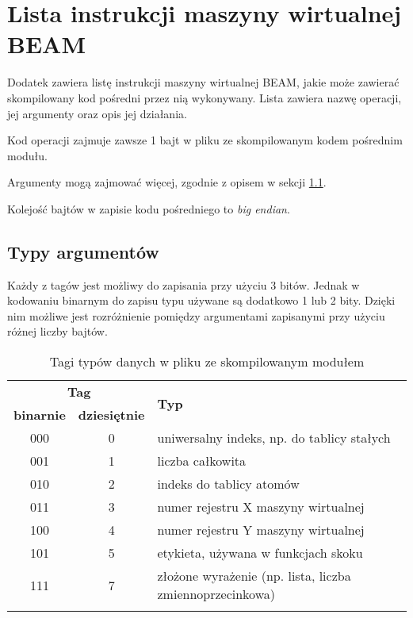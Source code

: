 \chapter{Lista instrukcji maszyny wirtualnej BEAM}
\label{cha:operacjeBeam}

Dodatek zawiera listę instrukcji maszyny wirtualnej BEAM, jakie może zawierać skompilowany kod pośredni przez nią wykonywany.
Lista zawiera nazwę operacji, jej argumenty oraz opis jej działania.

Kod operacji zajmuje zawsze 1 bajt w pliku ze skompilowanym kodem pośrednim modułu.

Argumenty mogą zajmować więcej, zgodnie z opisem w sekcji \ref{sec:opsTypes}.

Kolejość bajtów w zapisie kodu pośredniego to \emph{big endian}.


\section{Typy argumentów}
\label{sec:opsTypes}

Każdy z tagów jest możliwy do zapisania przy użyciu 3 bitów.
Jednak w kodowaniu binarnym do zapisu typu używane są dodatkowo 1 lub 2 bity. Dzięki nim możliwe jest rozróżnienie pomiędzy argumentami zapisanymi przy użyciu różnej liczby bajtów.

\begin{longtable}{|c|c|p{9cm}|}
\hline

\multicolumn{2}{|c|}{\textbf{Tag}} & \multirow{2}{*}{\textbf{Typ}} \\
\cline{1-2}
\textbf{binarnie} & \textbf{dziesiętnie} & \\
\hline
\endfirsthead

000 & 0 & uniwersalny indeks, np. do tablicy stałych \\
\hline
001 & 1 & liczba całkowita \\ 
\hline
010 & 2 & indeks do tablicy atomów \\
\hline
011 & 3 & numer rejestru X maszyny wirtualnej \\
\hline
100 & 4 & numer rejestru Y maszyny wirtualnej \\
\hline
101 & 5 & etykieta, używana w funkcjach skoku \\
\hline
111 & 7 & złożone wyrażenie (np. lista, liczba zmiennoprzecinkowa) \\
\hline

\caption{Tagi typów danych w pliku ze skompilowanym modułem}  \\
\end{longtable}

